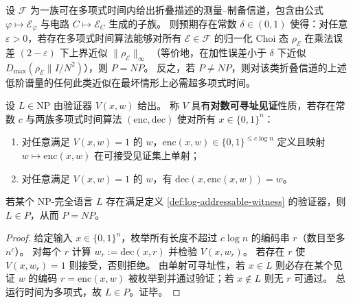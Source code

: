 \begin{conjecture}\label{conj:fold-spectral-low-order-pnp}
设 \(\mathcal F\) 为一族可在多项式时间内给出折叠描述的测量--制备信道，包含由公式 \(\varphi\mapsto \mathcal E_\varphi\) 与电路 \(C\mapsto \mathcal E_C\) 生成的子族。
则预期存在常数 \(\delta\in(0,1)\) 使得：对任意 \(\varepsilon>0\)，若存在多项式时间算法能够对所有 \(\mathcal E\in\mathcal F\) 的归一化 Choi 态 \(\rho_{\mathcal E}\) 在乘法误差 \((2-\varepsilon)\) 下上界近似
\(
\|\rho_{\mathcal E}\|_\infty
\)
（等价地，在加性误差小于 \(\delta\) 下近似 \(D_{\max}(\rho_{\mathcal E}\|I/N^2)\)），则 \(P=NP\)。
反之，若 \(P\neq NP\)，则对该类折叠信道的上述低阶谱量的任何此类近似在最坏情形上必需超多项式时间。
\end{conjecture}

\begin{definition}[对数可寻址见证]\label{def:log-addressable-witness}
设 \(L\in \mathrm{NP}\) 由验证器 \(V(x,w)\) 给出。
称 \(V\) 具有\textbf{对数可寻址见证}性质，若存在常数 \(c\) 与两族多项式时间算法 \((\mathrm{enc},\mathrm{dec})\) 使对所有 \(x\in\{0,1\}^n\)：
\begin{enumerate}
\normalfont
  \item 对任意满足 \(V(x,w)=1\) 的 \(w\)，\(\mathrm{enc}(x,w)\in\{0,1\}^{\le c\log n}\) 定义且映射 \(w\mapsto \mathrm{enc}(x,w)\) 在可接受见证集上单射；
  \item 对任意满足 \(V(x,w)=1\) 的 \(w\)，有 \(\mathrm{dec}(x,\mathrm{enc}(x,w))=w\)。
\end{enumerate}
\end{definition}

\begin{theorem}[对数可寻址见证在 NP-完全层面强迫 \texorpdfstring{$P=NP$}{P=NP}]\label{thm:log-addressable-witness-implies-P-equals-NP}
若某个 NP-完全语言 \(L\) 存在满足定义 \ref{def:log-addressable-witness} 的验证器，则 \(L\in P\)，从而 \(P=NP\)。
\end{theorem}
\begin{proof}
给定输入 \(x\in\{0,1\}^n\)，枚举所有长度不超过 \(c\log n\) 的编码串 \(r\)（数目至多 \(n^c\)）。
对每个 \(r\) 计算 \(w_r:=\mathrm{dec}(x,r)\) 并检验 \(V(x,w_r)\)。
若存在 \(r\) 使 \(V(x,w_r)=1\) 则接受，否则拒绝。
由单射可寻址性，若 \(x\in L\) 则必存在某个见证 \(w\) 的编码 \(r=\mathrm{enc}(x,w)\) 被枚举到并通过验证；若 \(x\notin L\) 则无 \(r\) 可通过。
总运行时间为多项式，故 \(L\in P\)。证毕。
\end{proof}

